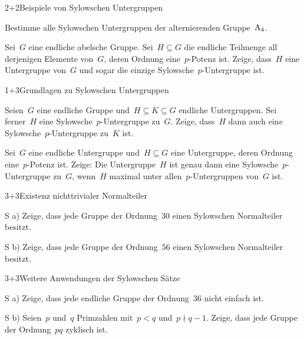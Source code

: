 \documentclass{algblatt}
\begin{document}

\begin{aufgabeE}{2+2}{Beispiele von Sylowschen Untergruppen}
\item
Bestimme alle Sylowschen Untergruppen der alternierenden Gruppe~$\mathrm{A}_4$.
\item
Sei~$G$ eine endliche abelsche Gruppe. Sei~$H \subseteq G$ die endliche
Teilmenge all derjenigen Elemente von~$G$, deren Ordnung eine~$p$-Potenz ist.
Zeige, dass~$H$ eine Untergruppe von~$G$ und sogar die einzige
Sylowsche~$p$-Untergruppe ist.
\end{aufgabeE}

\begin{aufgabeE}{1+3}{Grundlagen zu Sylowschen Untergruppen}
\item Seien~$G$ eine endliche Gruppe und~$H \subseteq K \subseteq G$ endliche
Untergruppen. Sei ferner~$H$ eine Sylowsche~$p$-Untergruppe zu~$G$. Zeige,
dass~$H$ dann auch eine Sylowsche~$p$-Untergruppe zu~$K$ ist.
\item Sei~$G$ eine endliche Untergruppe und~$H \subseteq G$ eine Untergruppe,
deren Ordnung eine~$p$-Potenz ist. Zeige: Die Untergruppe~$H$ ist genau dann
eine Sylowsche~$p$-Untergruppe zu~$G$, wenn~$H$ maximal unter
allen~$p$-Untergruppen von~$G$ ist.
\end{aufgabeE}

\begin{aufgabeE}{3+3}{Existenz nichttrivialer Normalteiler}
\item[S a)] Zeige, dass jede Gruppe der Ordnung~$30$ einen
Sylowschen Normalteiler besitzt.
\item[S b)] Zeige, dass jede Gruppe der Ordnung~$56$ einen
Sylowschen Normalteiler besitzt.
\end{aufgabeE}

\begin{aufgabeE}{3+3}{Weitere Anwendungen der Sylowschen Sätze}
\item[S a)] Zeige, dass jede endliche Gruppe der Ordnung~$36$ nicht einfach ist.
\item[S b)] Seien~$p$ und~$q$ Primzahlen mit~$p < q$ und~$p \nmid q-1$. Zeige,
dass jede Gruppe der Ordnung~$pq$ zyklisch ist.
\end{aufgabeE}
\end{document}

